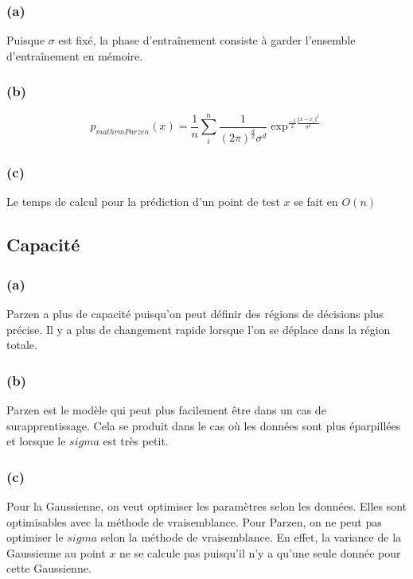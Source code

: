 \documentclass{article}
\begin{document}
	\subsubsection*{(a)}
	Puisque $\sigma$ est fixé, la phase d'entraînement consiste à garder l'ensemble d'entraînement en mémoire.
	\subsubsection*{(b)}
	\begin{equation}
	p_{mathrmParzen}(x) =
	\frac{1}{n}\sum_{i}^{n}\frac{1}{(2\pi)^{\frac{d}{2}}\sigma^d}\exp^{\frac{-1}{2}\frac{\Vert x-x_i\Vert^2}{\sigma^2}}
	\end{equation}
	\subsubsection*{(c)}
	Le temps de calcul pour la prédiction d'un point de test $x$ se fait en $O(n)$
	
	\subsection{Capacité}
	
	\subsubsection*{(a)}
	Parzen a plus de capacité puisqu'on peut définir des régions de décisions plus précise. Il y a plus de changement rapide lorsque l'on se déplace dans la région totale.
	
	\subsubsection*{(b)}
	Parzen est le modèle qui peut plus facilement être dans un cas de surapprentissage. Cela se produit dans le cas où les données sont plus éparpillées et lorsque le $sigma$ est très petit.
	
	\subsubsection*{(c)}
	Pour la Gaussienne, on veut optimiser les paramètres selon les données. Elles sont optimisables avec la méthode de vraisemblance. Pour Parzen, on ne peut pas optimiser le $sigma$ selon la méthode de vraisemblance. En effet, la variance de la Gaussienne au point $x$ ne se calcule pas puisqu'il n'y a qu'une seule donnée pour cette Gaussienne.
	
\end{document}
